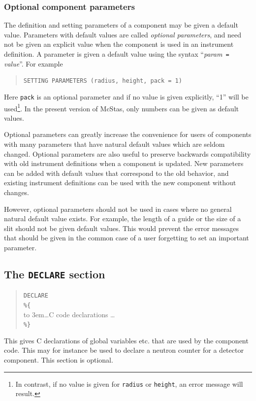 {\subsubsection{Optional component parameters}

The definition and setting parameters of a component may be given a
default value. Parameters with default values are called \emph{optional
  parameters}, and need not be given an explicit value when the
component is used in an instrument definition. A parameter is given a
default value using the syntax ``\textit{param}\texttt{ = }\textit{value}''.
For example
\begin{quote}
  \texttt{SETTING PARAMETERS (radius, height, pack = 1)}
\end{quote}
Here \verb+pack+ is an optional parameter and if no value is given
explicitly, ``1'' will be used\footnote{In contrast, if no value is
  given for \texttt{radius} or \texttt{height}, an error message will
  result.}. In the present version of McStas, only numbers can be given
as default values.

Optional parameters can greatly increase the convenience for users of
components with many parameters that have natural default values which
are seldom changed. Optional parameters are also useful to preserve
backwards compatibility with old instrument definitions when a component
is updated. New parameters can be added with default values that
correspond to the old behavior, and existing instrument definitions can
be used with the new component without changes.

However, optional parameters should not be used in cases where no
general natural default value exists. For example, the length of a guide
or the size of a slit should not be given default values. This would
prevent the error messages that should be given in the common case of a
user forgetting to set an important parameter.


\subsection{The \texttt{DECLARE} section}
\label{s:comp-declare}
\begin{quote}
  \texttt{DECLARE} \\
  \verb|%{| \\
  \hbox to 3em{}\ldots C code declarations \ldots \\
  \verb|%}|
\end{quote}
This gives C declarations of global variables etc. that are used by the
component code. This may for instance be used to declare a neutron
counter for a detector component. This section is optional.

}
